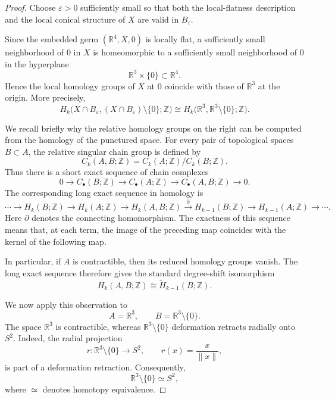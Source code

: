 \documentclass[11pt]{amsart}
\theoremstyle{definition}
\theoremstyle{remark}
\begin{document}
\begin{proof}
Choose \(\varepsilon>0\) sufficiently small so that both the local-flatness
description and the local conical structure of \(X\) are valid in
\(B_\varepsilon\).

Since the embedded germ \((\mathbb R^4,X,0)\) is locally flat, a sufficiently
small neighborhood of \(0\) in \(X\) is homeomorphic to a sufficiently small
neighborhood of \(0\) in the hyperplane
\[
\mathbb R^3\times\{0\}\subset\mathbb R^4.
\]
Hence the local homology groups of \(X\) at \(0\) coincide with those of
\(\mathbb R^3\) at the origin. More precisely,
\[
H_k\bigl(
X\cap B_\varepsilon,
(X\cap B_\varepsilon)\setminus\{0\};
\mathbb Z
\bigr)
\cong
H_k\bigl(
\mathbb R^3,
\mathbb R^3\setminus\{0\};
\mathbb Z
\bigr).
\]

We recall briefly why the relative homology groups on the right can be
computed from the homology of the punctured space. For every pair of
topological spaces \(B\subset A\), the relative singular chain group is
defined by
\[
C_k(A,B;\mathbb Z)
=
C_k(A;\mathbb Z)/C_k(B;\mathbb Z).
\]
Thus there is a short exact sequence of chain complexes
\[
0
\longrightarrow
C_\bullet(B;\mathbb Z)
\longrightarrow
C_\bullet(A;\mathbb Z)
\longrightarrow
C_\bullet(A,B;\mathbb Z)
\longrightarrow
0.
\]
The corresponding long exact sequence in homology is
\[
\cdots
\longrightarrow
H_k(B;\mathbb Z)
\longrightarrow
H_k(A;\mathbb Z)
\longrightarrow
H_k(A,B;\mathbb Z)
\overset{\partial}{\longrightarrow}
H_{k-1}(B;\mathbb Z)
\longrightarrow
H_{k-1}(A;\mathbb Z)
\longrightarrow
\cdots .
\]
Here \(\partial\) denotes the connecting homomorphism. The exactness of this
sequence means that, at each term, the image of the preceding map coincides
with the kernel of the following map.

In particular, if \(A\) is contractible, then its reduced homology groups
vanish. The long exact sequence therefore gives the standard degree-shift
isomorphism
\[
H_k(A,B;\mathbb Z)
\cong
\widetilde H_{k-1}(B;\mathbb Z).
\]

We now apply this observation to
\[
A=\mathbb R^3,
\qquad
B=\mathbb R^3\setminus\{0\}.
\]
The space \(\mathbb R^3\) is contractible, whereas
\(\mathbb R^3\setminus\{0\}\) deformation retracts radially onto \(S^2\).
Indeed, the radial projection
\[
r:\mathbb R^3\setminus\{0\}\longrightarrow S^2,
\qquad
r(x)=\frac{x}{\|x\|},
\]
is part of a deformation retraction. Consequently,
\[
\mathbb R^3\setminus\{0\}\simeq S^2,
\]
where \(\simeq\) denotes homotopy equivalence.


\end{proof}
\end{document}
